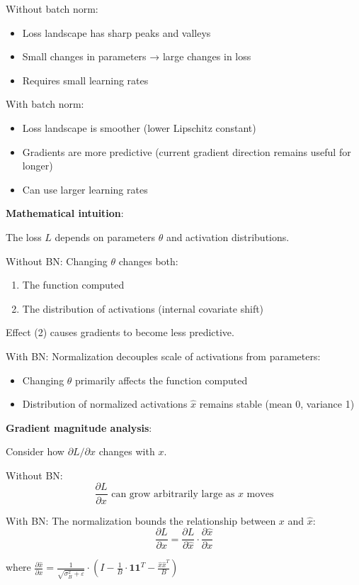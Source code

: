 Without batch norm:
\begin{itemize}
\item Loss landscape has sharp peaks and valleys
\item Small changes in parameters → large changes in loss
\item Requires small learning rates
\end{itemize}

With batch norm:
\begin{itemize}
\item Loss landscape is smoother (lower Lipschitz constant)
\item Gradients are more predictive (current gradient direction remains useful for longer)
\item Can use larger learning rates
\end{itemize}

\textbf{Mathematical intuition}:

The loss $L$ depends on parameters $\theta$ and activation distributions.

Without BN: Changing $\theta$ changes both:
\begin{enumerate}
\item The function computed
\item The distribution of activations (internal covariate shift)
\end{enumerate}

Effect (2) causes gradients to become less predictive.

With BN: Normalization decouples scale of activations from parameters:
\begin{itemize}
\item Changing $\theta$ primarily affects the function computed
\item Distribution of normalized activations $\hat{x}$ remains stable (mean 0, variance 1)
\end{itemize}

\textbf{Gradient magnitude analysis}:

Consider how $\partial L/\partial x$ changes with $x$.

Without BN:
\[
\frac{\partial L}{\partial x} \text{ can grow arbitrarily large as } x \text{ moves}
\]

With BN: The normalization bounds the relationship between $x$ and $\hat{x}$:
\[
\frac{\partial L}{\partial x} = \frac{\partial L}{\partial \hat{x}} \cdot \frac{\partial \hat{x}}{\partial x}
\]

where $\frac{\partial \hat{x}}{\partial x} = \frac{1}{\sqrt{\sigma_B^2 + \varepsilon}} \cdot \left(I - \frac{1}{B} \cdot \mathbf{1}\mathbf{1}^T - \frac{\hat{x}\hat{x}^T}{B}\right)$

